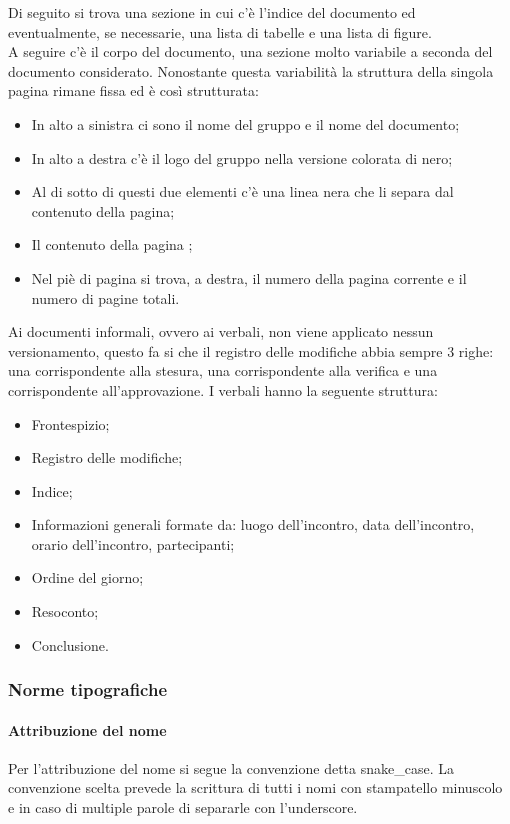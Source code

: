 \documentclass[../norme_di_progetto.tex]{subfiles}
\begin{document}
Di seguito si trova una sezione in cui c'è l'indice del documento ed eventualmente, se necessarie, una lista di tabelle e una lista di figure.\\
A seguire c'è il corpo del documento, una sezione molto variabile a seconda del documento considerato. Nonostante questa variabilità la struttura della singola pagina rimane fissa ed è così strutturata:
\begin{itemize}
    \item In alto a sinistra ci sono il nome del gruppo e il nome del documento;
    \item In alto a destra c'è il logo del gruppo nella versione colorata di nero;
    \item Al di sotto di questi due elementi c'è una linea nera che li separa dal contenuto della pagina;
    \item Il contenuto della pagina ;
    \item Nel piè di pagina si trova, a destra, il numero della pagina corrente e il numero di pagine totali.
\end{itemize}
Ai documenti informali, ovvero ai verbali, non viene applicato nessun versionamento, questo fa si che il registro delle modifiche abbia sempre 3 righe: una corrispondente alla stesura, una corrispondente alla verifica e una corrispondente all'approvazione. I verbali hanno la seguente struttura:
\begin{itemize}
    \item Frontespizio;
    \item Registro delle modifiche;
    \item Indice;
    \item Informazioni generali formate da: luogo dell'incontro, data dell'incontro, orario dell'incontro, partecipanti;
    \item Ordine del giorno;
    \item Resoconto;
    \item Conclusione.
\end{itemize}

\subsubsection{Norme tipografiche}

\paragraph{Attribuzione del nome}
Per l'attribuzione del nome si segue la convenzione detta snake\_case. La convenzione scelta prevede la scrittura di tutti i nomi con stampatello minuscolo e in caso di multiple parole di separarle con l'underscore.
\end{document}
